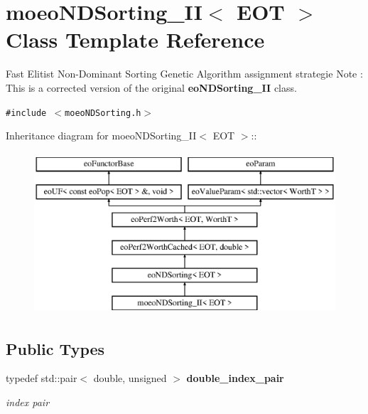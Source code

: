 \section{moeo\-NDSorting\_\-II$<$ EOT $>$ Class Template Reference}
\label{classmoeoNDSorting__II}
Fast Elitist Non-Dominant Sorting Genetic Algorithm assignment strategie Note : This is a corrected version of the original {\bf eo\-NDSorting\_\-II} class.  


{\tt \#include $<$moeo\-NDSorting.h$>$}

Inheritance diagram for moeo\-NDSorting\_\-II$<$ EOT $>$::\begin{figure}[H]
\begin{center}
\leavevmode
\includegraphics[height=6cm]{classmoeoNDSorting__II}
\end{center}
\end{figure}
\subsection*{Public Types}
\begin{CompactItemize}
\item 
typedef std::pair$<$ double, unsigned $>$ {\bf double\_\-index\_\-pair}\label{classmoeoNDSorting__II_0987beaa2f600f5bce61c77215679e43}

\begin{CompactList}\small\item\em index pair \item\end{CompactList}\end{CompactItemize}
